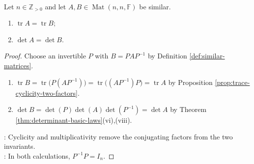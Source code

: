 \begin{theorem} \label{thm:similarity-preserves-trace-and-determinant} \\
Let $n\in\mathbb{Z}_{>0}$ and let $A,B\in\operatorname{Mat}(n,n,\mathbb{F})$ be similar.
\begin{enumerate}[label=(\roman*)]
\setlength{\itemsep}{0pt}
\item $\operatorname{tr}A=\operatorname{tr}B$;
\item $\det A=\det B$.
\end{enumerate}
\begin{proof}
Choose an invertible $P$ with $B=PAP^{-1}$ by Definition \ref{def:similar-matrices}.
\begin{enumerate}[label=(\roman*)]
\setlength{\itemsep}{0pt}
\item $\operatorname{tr}B=\operatorname{tr}\bigl(P(AP^{-1})\bigr)=\operatorname{tr}\bigl((AP^{-1})P\bigr)=\operatorname{tr}A$ by Proposition \ref{prop:trace-cyclicity-two-factors}.
\item $\det B=\det(P)\det(A)\det(P^{-1})=\det A$ by Theorem \ref{thm:determinant-basic-laws}(vi),(viii).
\end{enumerate}
: Cyclicity and multiplicativity remove the conjugating factors from the two invariants.\\
: In both calculations, $P^{-1}P=I_n$.
\end{proof}
\end{theorem}

